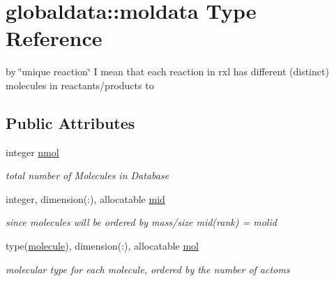 \hypertarget{structglobaldata_1_1moldata}{}\section{globaldata\+:\+:moldata Type Reference}
\label{structglobaldata_1_1moldata}


by \char`\"{}unique reaction\char`\"{} I mean that each reaction in rxl has different (distinct) molecules in reactants/products to  


\subsection*{Public Attributes}
\begin{DoxyCompactItemize}
\item 
\mbox{\label{structglobaldata_1_1moldata_a60ad45ff355fdfc0ad74cca79fd9eef1}} 
integer \mbox{\hyperlink{structglobaldata_1_1moldata_a60ad45ff355fdfc0ad74cca79fd9eef1}{nmol}}
\begin{DoxyCompactList}\small\item\em total number of Molecules in Database \end{DoxyCompactList}\item 
\mbox{\label{structglobaldata_1_1moldata_af433d1f7b70b8fc56acd571383779027}} 
integer, dimension(\+:), allocatable \mbox{\hyperlink{structglobaldata_1_1moldata_af433d1f7b70b8fc56acd571383779027}{mid}}
\begin{DoxyCompactList}\small\item\em since molecules will be ordered by mass/size mid(rank) = molid \end{DoxyCompactList}\item 
\mbox{\label{structglobaldata_1_1moldata_a28c892740ad281747bf015cacaf11ca8}} 
type(\mbox{\hyperlink{structglobaldata_1_1molecule}{molecule}}), dimension(\+:), allocatable \mbox{\hyperlink{structglobaldata_1_1moldata_a28c892740ad281747bf015cacaf11ca8}{mol}}
\begin{DoxyCompactList}\small\item\em molecular type for each molecule, ordered by the number of actoms \end{DoxyCompactList}\item 
\mbox{\label{structglobaldata_1_1moldata_a05519eb77473e7481f2c032f653b35f1}} 

\end{DoxyCompactItemize}

